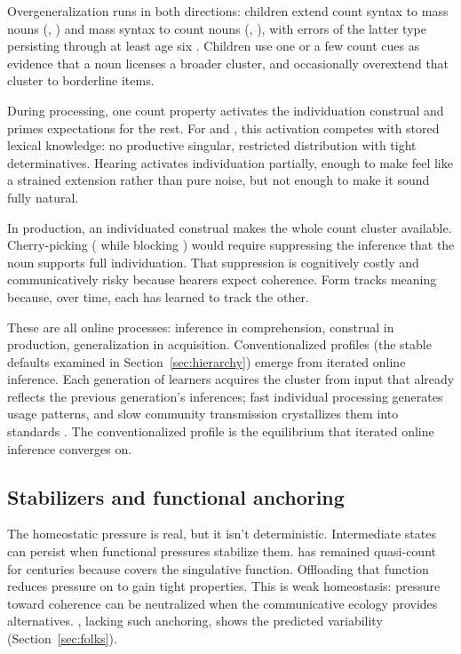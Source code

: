 \documentclass[12pt,a4paper]{article}
\begin{document}
Overgeneralization runs in both directions: children extend count syntax to mass nouns (, ) and mass syntax to count nouns (, ), with errors of the latter type persisting through at least age six \citep{gordon1985,gathercole1985}. Children use one or a few count cues as evidence that a noun licenses a broader cluster, and occasionally overextend that cluster to borderline items.

During processing, one count property activates the individuation construal and primes expectations for the rest. For  and , this activation competes with stored lexical knowledge: no productive singular, restricted distribution with tight determinatives. Hearing  activates individuation partially, enough to make  feel like a strained extension rather than pure noise, but not enough to make it sound fully natural.

In production, an individuated construal makes the whole count cluster available. Cherry-picking ( while blocking ) would require suppressing the inference that the noun supports full individuation. That suppression is cognitively costly and communicatively risky because hearers expect coherence. Form tracks meaning because, over time, each has learned to track the other.

These are all online processes: inference in comprehension, construal in production, generalization in acquisition. Conventionalized profiles (the stable defaults examined in Section~\ref{sec:hierarchy}) emerge from iterated online inference. Each generation of learners acquires the cluster from input that already reflects the previous generation's inferences; fast individual processing generates usage patterns, and slow community transmission crystallizes them into standards \citep{kirby2008,strogatz2015}. The conventionalized profile is the equilibrium that iterated online inference converges on.

\subsection{Stabilizers and functional anchoring}

The homeostatic pressure is real, but it isn't deterministic. Intermediate states can persist when functional pressures stabilize them.  has remained quasi-count for centuries because  covers the singulative function. Offloading that function reduces pressure on  to gain tight properties. This is weak homeostasis: pressure toward coherence can be neutralized when the communicative ecology provides alternatives. , lacking such anchoring, shows the predicted variability (Section~\ref{sec:folks}).
\end{document}

